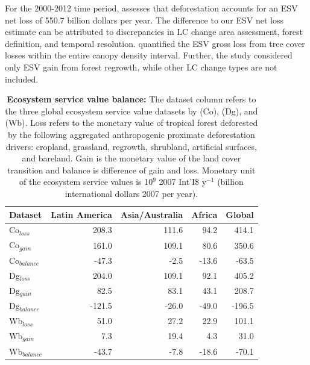 		For the 2000-2012 time period, \citet{Song2018} assesses that deforestation accounts for an \ac{ESV} net loss of 550.7 billion dollars per year. The difference to our \ac{ESV} net loss estimate can be attributed to discrepancies in \ac{LC} change area assessment, forest definition, and temporal resolution. \citet{Song2018} quantified the \ac{ESV} gross loss from tree cover losses within the entire canopy density interval. Further, the study considered only \ac{ESV} gain from forest regrowth, while other \ac{LC} change types are not included.
		\begin{table}[ht]
			\centering
			\caption[Ecosystem service value balance]{\textbf{Ecosystem service value balance:} The dataset column refers to the three global ecosystem service value datasets by \citet{Costanza2014} (Co), \citet{Groot2012} (Dg), and \citet{Siikamaki2015} (Wb). Loss refers to the monetary value of tropical forest deforested by the following aggregated anthropogenic proximate deforestation drivers: cropland, grassland, regrowth, shrubland, artificial surfaces, and bareland. Gain is the monetary value of the land cover transition and balance is difference of gain and loss. Monetary unit of the ecosystem service values is 10$^{9}$ 2007 Int'I\$ y$^{-1}$ (billion international dollars 2007 per year).}
			\label{tab:esv_results}
			\begin{tabular}{lrrrr}
				\hline
				Dataset & Latin America & Asia/Australia & Africa & Global\\
				\hline
				Co$_{loss}$ & 208.3 & 111.6 & 94.2 & 414.1 \\
				Co$_{gain}$ & 161.0 & 109.1 & 80.6 & 350.6 \\
				Co$_{balance}$ & -47.3 & -2.5 & -13.6 & -63.5\\
				Dg$_{loss}$ & 204.0 & 109.1 & 92.1 & 405.2\\
				Dg$_{gain}$ & 82.5 & 83.1 & 43.1 & 208.7\\
				Dg$_{balance}$ & -121.5 & -26.0 & -49.0 & -196.5\\
				Wb$_{loss}$ & 51.0 & 27.2 & 22.9 & 101.1\\
				Wb$_{gain}$ & 7.3 & 19.4 & 4.3 & 31.0 \\
				Wb$_{balance}$ & -43.7 & -7.8 & -18.6 & -70.1 \\
				\hline
			\end{tabular}
		\end{table}

